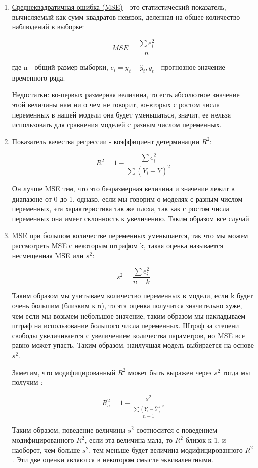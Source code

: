 \documentclass{article}
\begin{document}
\begin{enumerate}
    \item \underline{Среднеквадратичная ошибка (MSE)} - это статистический показатель, вычисляемый как сумм квадратов невязок, деленная на общее количество наблюдений в выборке: 

$$MSE = \frac{\sum e^2_i}{n}$$

где n - общий размер выборки, $e_i = y_t - \hat y_t, \hat y_t$ - прогнозное значение временного ряда. 

Недостатки: во-первых размерная величина, то есть абсолютное значение этой величины нам ни о чем не говорит, во-вторых с ростом числа переменных в нашей модели она будет уменьшаться, значит, ее нельзя использовать для сравнения моделей с разным числом переменных. 

\item Показатель качества регрессии - \underline{коэффициент детерминации $R^2:$}

$$R^2 = 1 -\frac {\sum e^2_i}{\sum(Y_i - \bar Y)^2}$$

Он лучше MSE тем, что это безразмерная величина и значение лежит в диапазоне от 0 до 1, однако, если мы говорим о моделях с разным числом переменных, эта характеристика так же плоха, так как с ростом числа переменных она имеет склонность к увеличению. Таким образом все случай

\item MSE при большом количестве переменных уменьшается, так что мы можем рассмотреть MSE с некоторым штрафом k, такая оценка называется \underline{несмещенная MSE или $s^2$}: 

$$s^2 = \frac{\sum e^2_i}{n-k}$$

Таким образом мы учитываем количество переменных в модели, если k будет очень большим (близким к n), то эта оценка получится значительно хуже, чем если мы возьмем небольшое значение, таким образом мы накладываем штраф на использование большого числа переменных. Штраф за степени свободы увеличивается с увеличением количества параметров, но MSE все равно может упасть. Таким образом, наилучшая модель выбирается на основе $s^2$.

Заметим, что \underline{модифицированный $R^2$} может быть выражен через $s^2$ тогда мы получим : 

$$R^2_a = 1 - \frac{s^2}{\frac{\sum(Y_i - \bar Y)^2}{n-1}}$$

Таким образом, поведение величины $s^2$ соотносится с поведением модифицированного $R^2$, если эта величина мала, то $R^2$ близок к 1, и наоборот, чем больше $s^2$, тем меньше будет величина модифицированного $R^2$. Эти две оценки являются в некотором смысле эквивалентными. 
\end{enumerate}
\end{document}
